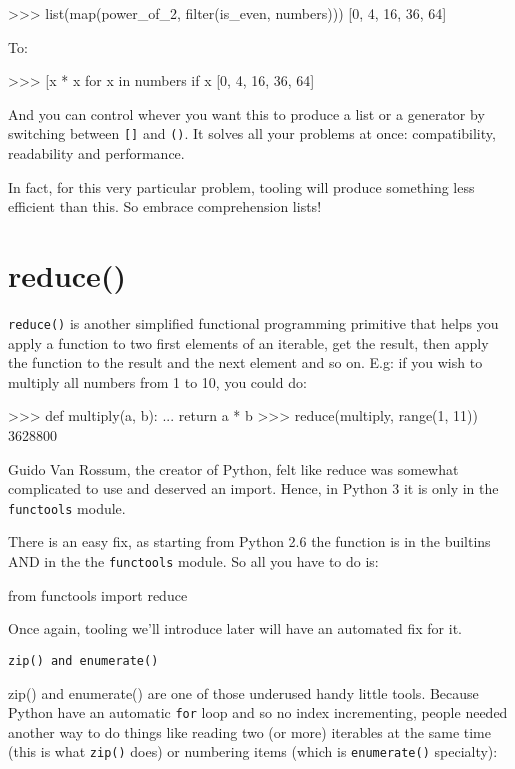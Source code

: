 \begin{py2and3}
>>> list(map(power_of_2, filter(is_even, numbers)))
[0, 4, 16, 36, 64]
\end{py2and3}

To:

\begin{py2and3}
>>> [x * x for x in numbers if x %
[0, 4, 16, 36, 64]
\end{py2and3}

And you can control whever you want this to produce a list or a generator by switching between \lstinline{[]} and \lstinline{()}. It solves all your problems at once: compatibility, readability and performance.

In fact, for this very particular problem, tooling will produce something less efficient than this. So embrace comprehension lists!

\section{reduce()}

\lstinline{reduce()} is another simplified functional programming primitive that helps you apply a function to two first elements of an iterable, get the result, then apply the function to the result and the next element and so on. E.g: if you wish to multiply all numbers from 1 to 10, you could do:

\begin{py2}
>>> def multiply(a, b):
...     return a * b
>>> reduce(multiply, range(1, 11))
3628800
\end{py2}

Guido Van Rossum, the creator of Python, felt like reduce was somewhat complicated to use and deserved an import. Hence, in Python 3 it is only in the \lstinline{functools} module.

There is an easy fix, as starting from Python 2.6 the function is in the builtins AND in the the \lstinline{functools} module. So all you have to do is:

\begin{py2and3}
from functools import reduce
\end{py2and3}

Once again, tooling we'll introduce later will have an automated fix for it.

\lstinline{zip() and enumerate()}

{zip()} and enumerate() are one of those underused handy little tools. Because Python have an automatic \lstinline{for} loop and so no index incrementing, people needed another way to do things like reading two (or more) \glspl{iterable} at the same time (this is what \lstinline{zip()} does) or numbering items (which is \lstinline{enumerate()} specialty):

